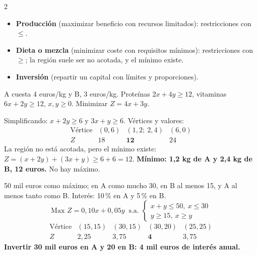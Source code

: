 \documentclass[10pt]{article}
\begin{document}
\begin{multicols}{2}
\begin{itemize}
  \item \textbf{Producción} (maximizar beneficio con recursos limitados): restricciones con \(\le\).
  \item \textbf{Dieta o mezcla} (minimizar coste con requisitos mínimos): restricciones con \(\ge\); la región suele ser no acotada, y el mínimo existe.
  \item \textbf{Inversión} (repartir un capital con límites y proporciones).
\end{itemize}
A cuesta 4 euros/kg y B, 3 euros/kg. Proteínas \(2x+4y\ge12\), vitaminas \(6x+2y\ge12\), \(x,y\ge0\). Minimizar \(Z=4x+3y\).
\begin{center}
\end{center}
Simplificando: \(x+2y\ge6\) y \(3x+y\ge6\). Vértices y valores:
\[\begin{array}{c|ccc}\text{Vértice}&(0,6)&(1{,}2;\ 2{,}4)&(6,0)\\\hline Z&18&\mathbf{12}&24\end{array}\]
La región no está acotada, pero el mínimo existe: \(Z=(x+2y)+(3x+y)\ge6+6=12\). \textbf{Mínimo: 1,2 kg de A y 2,4 kg de B, 12 euros.} No hay máximo.

50 mil euros como máximo; en A como mucho 30, en B al menos 15, y A al menos tanto como B. Interés: 10\,\% en A y 5\,\% en B.
\[\text{Max }Z=0{,}10x+0{,}05y\ \text{ s.a. }\begin{cases}x+y\le50,\ x\le30\\ y\ge15,\ x\ge y\end{cases}\]
\[\begin{array}{c|cccc}\text{Vértice}&(15,15)&(30,15)&(30,20)&(25,25)\\\hline Z&2{,}25&3{,}75&\mathbf{4}&3{,}75\end{array}\]
\textbf{Invertir 30 mil euros en A y 20 en B: 4 mil euros de interés anual.}


\end{multicols}
\end{document}

